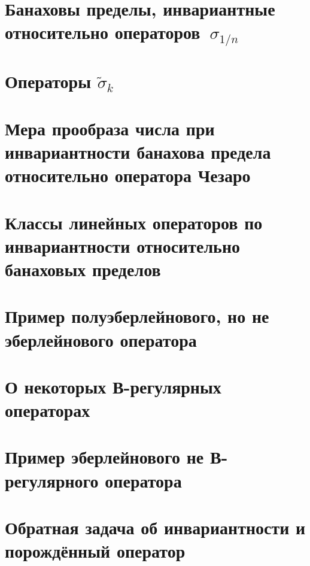 \documentclass[12pt,a4paper,openbib]{report}
\theoremstyle{definition}
\begin{document}
	\section{Банаховы пределы, инвариантные относительно операторов~$\sigma_{1/n}$}
	

	\section{Операторы $\tilde\sigma_k$}
	

	\section{Мера прообраза числа при инвариантности банахова предела относительно оператора Чезаро}
	


	\section{Классы линейных операторов по инвариантности относительно банаховых пределов}
	

	\section{Пример полуэберлейнового, но не эберлейнового оператора}
	

	\section{О некоторых В-регулярных операторах}
	
	

	\section{Пример эберлейнового не В-регулярного оператора}
	

	\section{Обратная задача об инвариантности и порождённый оператор}
	
\end{document}
